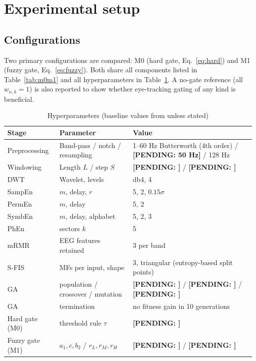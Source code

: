 \documentclass[11pt,a4paper]{article}
\newcommand{\pending}[1]{\textcolor{red!75!black}{\textbf{[PENDING: #1]}}}
\begin{document}
\section{Experimental setup}
\label{sec:setup}

\subsection{Configurations}
Two primary configurations are compared: M0 (hard gate, Eq.~\ref{eq:hard}) and M1 (fuzzy gate, Eq.~\ref{eq:fuzzy}). Both share all components listed in Table~\ref{tab:m0m1} and all hyperparameters in Table~\ref{tab:hyper}. A no-gate reference (all $w_{n,k}=1$) is also reported to show whether eye-tracking gating of any kind is beneficial.

\begin{table}[t]
\centering\small
\caption{Hyperparameters (baseline values from \cite{FarhadiSedehi2024a} unless stated)}\label{tab:hyper}
\begin{tabularx}{\linewidth}{@{}llX@{}}
\toprule
Stage & Parameter & Value\\
\midrule
Preprocessing & Band-pass / notch / resampling & 1--60 Hz Butterworth (4th order) / \pending{50 Hz} / 128 Hz\\
Windowing & Length $L$ / step $S$ & \pending{} / \pending{}\\
DWT & Wavelet, levels & db4, 4\\
SampEn & $m$, delay, $r$ & 5, 2, $0.15\sigma$\\
PermEn & $m$, delay & 5, 2\\
SymbEn & $m$, delay, alphabet & 5, 2, 3\\
PhEn & sectors $k$ & 5\\
mRMR & EEG features retained & 3 per band\\
S-FIS & MFs per input, shape & 3, triangular (entropy-based split points)\\
GA & population / crossover / mutation & \pending{} / \pending{} / \pending{}\\
GA & termination & no fitness gain in 10 generations\\
Hard gate (M0) & threshold rule $\tau$ & \pending{}\\
Fuzzy gate (M1) & $a_1, c, b_2$ / $r_L, r_M, r_H$ & \pending{} / \pending{}\\
\bottomrule
\end{tabularx}
\end{table}
\end{document}

